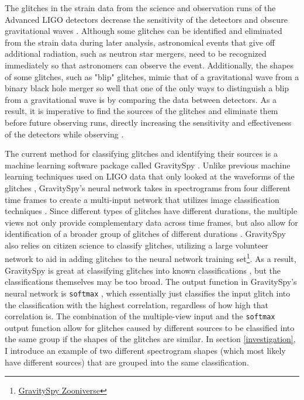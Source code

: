 \documentclass[a4paper]{article}
\begin{document}
The glitches in the strain data from the science and observation runs of the Advanced LIGO detectors decrease the sensitivity of the detectors and obscure gravitational waves \cite{Zevin:2016}. Although some glitches can be identified and eliminated from the strain data during later analysis, astronomical events that give off additional radiation, such as neutron star mergers, need to be recognized immediately so that astronomers can observe the event. Additionally, the shapes of some glitches, such as "blip" glitches, mimic that of a gravitational wave from a binary black hole merger so well that one of the only ways to distinguish a blip from a gravitational wave is by comparing the data between detectors. As a result, it is imperative to find the sources of the glitches and eliminate them before future observing runs, directly increasing the sensitivity and effectiveness of the detectors while observing \cite{Mukherjee:2010}. 

The current method for classifying glitches and identifying their sources is a machine learning software package called GravitySpy \cite{Zevin:2016}. Unlike previous machine learning techniques used on LIGO data that only looked at the waveforms of the glitches \cite{Mukherjee:2010}, GravitySpy's neural network takes in spectrograms from four different time frames to create a multi-input network that utilizes image classification techniques \cite{Bahaadini:2017}. Since different types of glitches have different durations, the multiple views not only provide complementary data across time frames, but also allow for identification of a broader group of glitches of different durations \cite{Bahaadini:2017}. GravitySpy also relies on citizen science to classify glitches, utilizing a large volunteer network to aid in adding glitches to the neural network training set\footnote{\href{https://www.zooniverse.org/projects/zooniverse/gravity-spy}{GravitySpy Zooniverse}}. As a result, GravitySpy is great at classifying glitches into known classifications \cite{Zevin:2016}, but the classifications themselves may be too broad. The output function in GravitySpy's neural network is \texttt{softmax} \cite{Bahaadini:2017}, which essentially just classifies the input glitch into the classification with the highest correlation, regardless of how high that correlation is. The combination of the multiple-view input and the \texttt{softmax} output function allow for glitches caused by different sources to be classified into the same group if the shapes of the glitches are similar. In section \ref{investigation}, I introduce an example of two different spectrogram shapes (which most likely have different sources) that are grouped into the same classification. 
\end{document}

